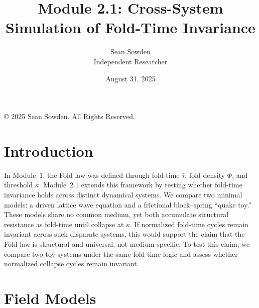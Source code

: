 \documentclass[12pt]{article}
\title{Module 2.1: Cross-System Simulation of Fold-Time Invariance}
\author{Sean Sowden \\ \small Independent Researcher}
\date{August 31, 2025}
\begin{document}
\maketitle
\begin{center}
    \begingroup\small
\noindent © 2025 Sean Sowden. All Rights Reserved.
\par\endgroup

\end{center}

\setcounter{section}{0}
\setcounter{secnumdepth}{2} %
\setcounter{tocdepth}{2}    %
\renewcommand{\thesection}{2.1.\arabic{section}}
\renewcommand{\thesubsection}{2.1.\arabic{section}.\arabic{subsection}}
\renewcommand{\thesubsubsection}{2.1.\arabic{section}.\arabic{subsection}.\arabic{subsubsection}}
\section{Introduction}
In Module~1, the Fold law was defined through fold-time $\bar{\tau}$, fold density $\Phi$, and threshold $\kappa$. Module~2.1 extends this framework by testing whether fold-time invariance holds across distinct dynamical systems. We compare two minimal models: a driven lattice wave equation and a frictional block--spring ``quake toy.'' These models share no common medium, yet both accumulate structural resistance as fold-time until collapse at $\kappa$. If normalized fold-time cycles remain invariant across such disparate systems, this would support the claim that the Fold law is structural and universal, not medium-specific. To test this claim, we compare two toy systems under the same fold-time logic and assess whether normalized collapse cycles remain invariant.
\section{Field Models}
\end{document}
